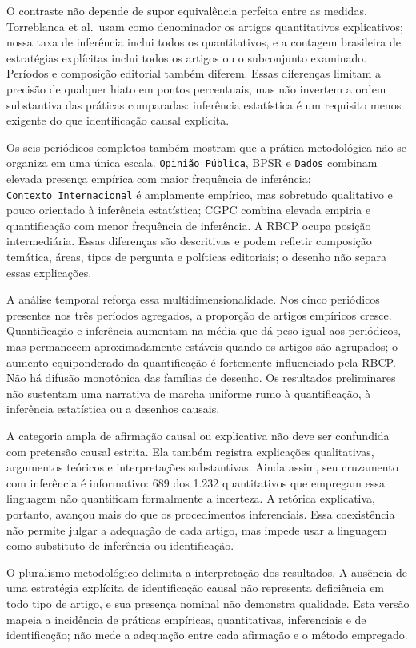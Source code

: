 \documentclass[
]{article}
\begin{document}
O contraste não depende de supor equivalência perfeita entre as medidas.
Torreblanca et al.~usam como denominador os artigos quantitativos
explicativos; nossa taxa de inferência inclui todos os quantitativos, e
a contagem brasileira de estratégias explícitas inclui todos os artigos
ou o subconjunto examinado. Períodos e composição editorial também
diferem. Essas diferenças limitam a precisão de qualquer hiato em pontos
percentuais, mas não invertem a ordem substantiva das práticas
comparadas: inferência estatística é um requisito menos exigente do que
identificação causal explícita.

Os seis periódicos completos também mostram que a prática metodológica
não se organiza em uma única escala. \texttt{Opinião\ Pública}, BPSR e
\texttt{Dados} combinam elevada presença empírica com maior frequência
de inferência; \texttt{Contexto\ Internacional} é amplamente empírico,
mas sobretudo qualitativo e pouco orientado à inferência estatística;
CGPC combina elevada empiria e quantificação com menor frequência de
inferência. A RBCP ocupa posição intermediária. Essas diferenças são
descritivas e podem refletir composição temática, áreas, tipos de
pergunta e políticas editoriais; o desenho não separa essas explicações.

A análise temporal reforça essa multidimensionalidade. Nos cinco
periódicos presentes nos três períodos agregados, a proporção de artigos
empíricos cresce. Quantificação e inferência aumentam na média que dá
peso igual aos periódicos, mas permanecem aproximadamente estáveis
quando os artigos são agrupados; o aumento equiponderado da
quantificação é fortemente influenciado pela RBCP. Não há difusão
monotônica das famílias de desenho. Os resultados preliminares não
sustentam uma narrativa de marcha uniforme rumo à quantificação, à
inferência estatística ou a desenhos causais.

A categoria ampla de afirmação causal ou explicativa não deve ser
confundida com pretensão causal estrita. Ela também registra explicações
qualitativas, argumentos teóricos e interpretações substantivas. Ainda
assim, seu cruzamento com inferência é informativo: 689 dos 1.232
quantitativos que empregam essa linguagem não quantificam formalmente a
incerteza. A retórica explicativa, portanto, avançou mais do que os
procedimentos inferenciais. Essa coexistência não permite julgar a
adequação de cada artigo, mas impede usar a linguagem como substituto de
inferência ou identificação.

O pluralismo metodológico delimita a interpretação dos resultados. A
ausência de uma estratégia explícita de identificação causal não
representa deficiência em todo tipo de artigo, e sua presença nominal
não demonstra qualidade. Esta versão mapeia a incidência de práticas
empíricas, quantitativas, inferenciais e de identificação; não mede a
adequação entre cada afirmação e o método empregado.
\end{document}

